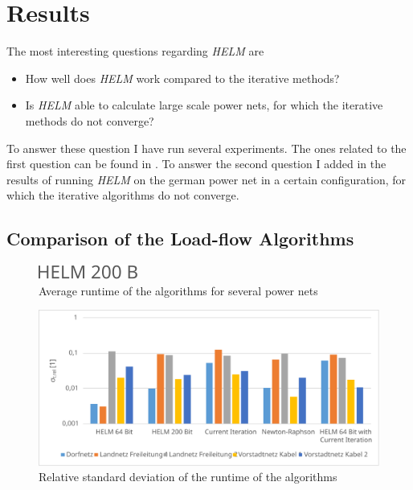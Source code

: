 \chapter{Results}
\label{sec:results}
The most interesting questions regarding \emph{HELM} are
\begin{itemize}
	\item How well does \emph{HELM} work compared to the iterative methods?
	\item Is \emph{HELM} able to calculate large scale power nets, for which the iterative methods do not converge?
\end{itemize}
To answer these question I have run several experiments. The ones related to the first question can be found in . To answer the second question I added in  the results of running \emph{HELM} on the german power net in a certain configuration, for which the iterative algorithms do not converge.

\section{Comparison of the Load-flow Algorithms}
\label{sec:comparison_algorithms}

\begin{figure}
	\centering
	\includegraphics[scale=0.7]{figures/comparison_runtime}
	\caption[Comparison, average runtime]{Average runtime of the algorithms for several power nets}
	\label{fig:comparison_runtime}
\end{figure}

\begin{figure}
	\centering
	\includegraphics[scale=0.7]{figures/comparison_deviation}
	\caption[Comparison, relative standard deviation of runtime]{Relative standard deviation of the runtime of the algorithms}
	\label{fig:comparison_deviation}
\end{figure}

